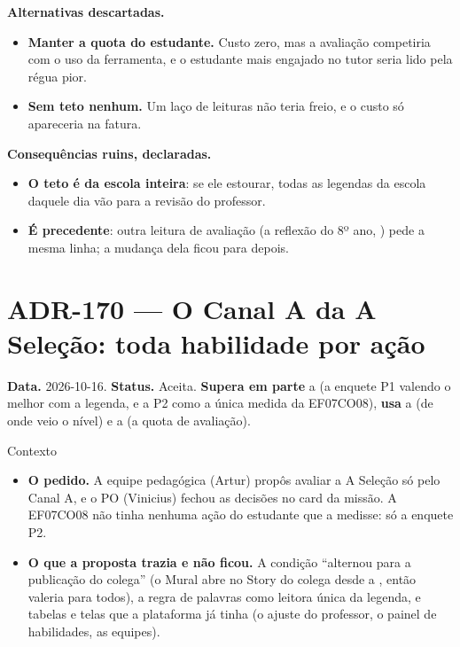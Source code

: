 \textbf{Alternativas descartadas.}

\begin{itemize}
  \item \textbf{Manter a quota do estudante.} Custo zero, mas a avaliação
    competiria com o uso da ferramenta, e o estudante mais engajado no tutor
    seria lido pela régua pior.
  \item \textbf{Sem teto nenhum.} Um laço de leituras não teria freio, e o custo
    só apareceria na fatura.
\end{itemize}

\textbf{Consequências ruins, declaradas.}

\begin{itemize}
  \item \textbf{O teto é da escola inteira}: se ele estourar, todas as legendas
    da escola daquele dia vão para a revisão do professor.
  \item \textbf{É precedente}: outra leitura de avaliação (a reflexão do 8º ano,
    ) pede a mesma linha; a mudança dela ficou para depois.
\end{itemize}

\section{ADR-170 --- O Canal A da A Seleção: toda habilidade por ação}
\label{adr:exp07ef1b-canal-a}

\textbf{Data.} 2026-10-16. \textbf{Status.} Aceita. \textbf{Supera em parte} a
 (a enquete P1 valendo o melhor com a legenda, e a P2 como a
única medida da EF07CO08), \textbf{usa} a  (de onde veio o nível)
e a  (a quota de avaliação).

\begin{especificacao}{Contexto}
\begin{itemize}
  \item \textbf{O pedido.} A equipe pedagógica (Artur) propôs avaliar a A
    Seleção só pelo Canal A, e o PO (Vinicius) fechou as decisões no card da
    missão. A EF07CO08 não tinha nenhuma ação do estudante que a medisse: só a
    enquete P2.
  \item \textbf{O que a proposta trazia e não ficou.} A condição
    \enquote{alternou para a publicação do colega} (o Mural abre no Story do
    colega desde a , então valeria para todos), a regra de
    palavras como leitora única da legenda, e tabelas e telas que a plataforma
    já tinha (o ajuste do professor, o painel de habilidades, as equipes).
\end{itemize}
\end{especificacao}


